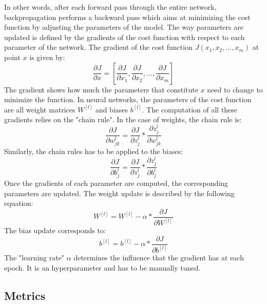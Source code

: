 In other words, after each forward pass through the entire network, backpropagation performs a backward pass which aims at minimizing the cost function by adjusting the parameters of the model. The way parameters are updated is defined by the gradients of the cost function with respect to each parameter of the network. The gradient of the cost function $J(x_{1}, x_{2}, ..., x_{m})$ at point $x$ is given by:
\begin{equation}
\frac{\partial J}{\partial x} = [\frac{\partial J}{\partial x_{1}}, \frac{\partial J}{\partial x_{2}}, ..., \frac{\partial J}{\partial x_{m}}]
\end{equation}
The gradient shows how much the parameters that constitute $x$ need to change to minimize the function. In neural networks, the parameters of the cost function are all weight matrices $W^{[l]}$ and biases $b^{[l]}$. The computation of all these gradients relies on the "chain rule". In the case of weights, the chain rule is:
\begin{equation}
\frac{\partial J}{\partial w_{jk}^{l}} = \frac{\partial J}{\partial z_{j}^{l}} * \frac{\partial z_{j}^{l}}{\partial w_{jk}^{l}}
\end{equation}
Similarly, the chain rules has to be applied to the biases:
\begin{equation}
\frac{\partial J}{\partial b_{j}^{l}} = \frac{\partial J}{\partial z_{j}^{l}} * \frac{\partial z_{j}^{l}}{\partial b_{j}^{l}}
\end{equation}
Once the gradients of each parameter are computed, the corresponding parameters are updated. The weight update is described by the following equation:
\begin{equation}
W^{[l]} = W^{[l]} - \alpha * \frac{\partial J}{\partial W^{[l]}}
\end{equation}
The bias update corresponds to:
\begin{equation}
b^{[l]} = b^{[l]} - \alpha * \frac{\partial J}{\partial b^{[l]}}
\end{equation}
The "learning rate" $\alpha$ determines the influence that the gradient has at each epoch. It is an hyperparameter and has to be manually tuned.


\subsection{Metrics}

